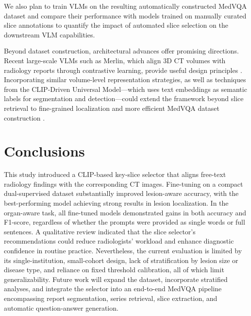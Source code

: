 \documentclass[bioengineering,article,submit,pdftex,moreauthors]{Definitions/mdpi}
\begin{document}
  We also plan to train VLMs on the resulting automatically constructed MedVQA dataset and compare their performance with models trained on manually curated slice annotations to quantify the impact of automated slice selection on the downstream VLM capabilities.



  Beyond dataset construction, architectural advances offer promising directions. 
  Recent large-scale VLMs such as Merlin, which align 3D CT volumes with radiology reports through contrastive learning, provide useful design principles \cite{blankemeier_merlin_2024}. 
  Incorporating similar volume-level representation strategies, as well as techniques from the CLIP-Driven Universal Model—which uses text embeddings as semantic labels for segmentation and detection—could extend the framework beyond slice retrieval to fine-grained localization and more efficient MedVQA dataset construction \cite{10376801}.


\section{Conclusions}

This study introduced a CLIP-based key-slice selector that aligns free-text radiology findings with the corresponding CT images. Fine-tuning on a compact dual-supervised dataset substantially improved lesion-aware accuracy, with the best-performing model achieving strong results in lesion localization. In the organ-aware task, all fine-tuned models demonstrated gains in both accuracy and F1-score, regardless of whether the prompts were provided as single words or full sentences. A qualitative review indicated that the slice selector’s recommendations could reduce radiologists’ workload and enhance diagnostic confidence in routine practice. Nevertheless, the current evaluation is limited by its single-institution, small-cohort design, lack of stratification by lesion size or disease type, and reliance on fixed threshold calibration, all of which limit generalizability. Future work will expand the dataset, incorporate stratified analyses, and integrate the selector into an end-to-end MedVQA pipeline encompassing report segmentation, series retrieval, slice extraction, and automatic question-answer generation.

\vspace{6pt} 

\end{document}
